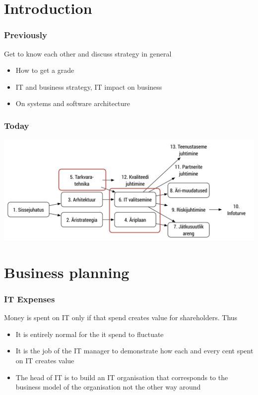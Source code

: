 

\maketitle

\section{Introduction}
\begin{frame}[fragile]
  \frametitle{Previously}
	Get to know each other and discuss strategy in general
	\begin{itemize}
		\item How to get a grade
		\item IT and business strategy, IT impact on business
		\item On systems and software architecture
	\end{itemize}
\end{frame}

\begin{frame}[fragile]
  \frametitle{Today}
		\includegraphics[width=\textwidth]{aine_struktuur_teine.pdf}
\end{frame}

\section{Business planning}
\begin{frame}[fragile]
  \frametitle{IT Expenses}
  	Money is spent on IT only if that spend creates value for shareholders. Thus
	\begin{itemize}
		\item It is entirely normal for the it spend to fluctuate
		\item It is the job of the IT manager to demonstrate how each and every cent spent on IT creates value 
		\item The head of IT is to build an IT organisation that corresponds to the business model of the organisation not the other way around
	\end{itemize}
\end{frame}

